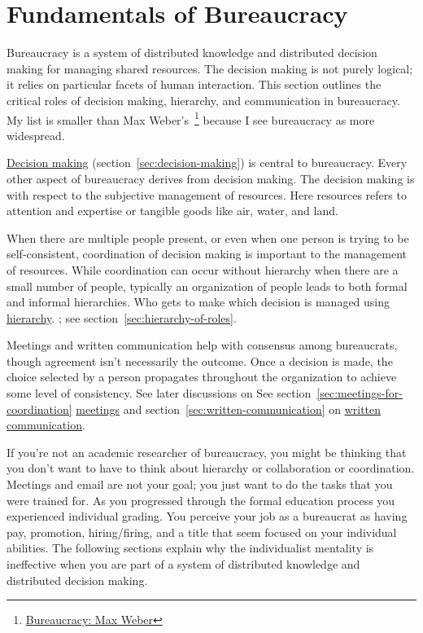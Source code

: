 \section{Fundamentals of Bureaucracy\label{sec:fundamentals-of-b}}
  
Bureaucracy is a system of distributed knowledge and distributed decision making for managing shared resources. The decision making is not purely logical; it relies on particular facets of human interaction. This section outlines the critical roles of decision making, hierarchy, and communication in bureaucracy. 
My list is smaller than Max Weber's~\cite{2015_Weber}\footnote{\href{https://en.wikipedia.org/wiki/Bureaucracy\#Max_Weber}{Bureaucracy: Max Weber}} because I see bureaucracy as more widespread.

\hyperref[sec:decision-making]{Decision making}
\ifsectionref
(section~\ref{sec:decision-making}) 
\fi
is central to bureaucracy. Every other aspect of bureaucracy derives from decision making. The decision making is with respect to the subjective management of resources. Here resources refers to attention and expertise or tangible goods like air, water, and land. 

When there are multiple people present, or even when one person is trying to be self-consistent, coordination of decision making is important to the management of resources. While coordination can occur without hierarchy when there are a small number of people, typically an organization of people leads to both formal and informal hierarchies. Who gets to make which decision is managed using
\hyperref[sec:hierarchy-of-roles]{hierarchy}.
\ifsectionref
; see section~\ref{sec:hierarchy-of-roles}.
\fi

Meetings and written communication help with consensus among bureaucrats, though agreement isn't necessarily the outcome.
Once a decision is made, the choice selected by a person propagates throughout the organization to achieve some level of consistency. 
See later discussions on
\ifsectionref
See section~\ref{sec:meetings-for-coordination}
\fi
\hyperref[sec:meetings-for-coordination]{meetings} and 
\ifsectionref
section~\ref{sec:written-communication} on
\fi
\hyperref[sec:written-communication]{written communication}.

If you're not an academic researcher of bureaucracy, you might be thinking that you don't want to have to think about hierarchy or collaboration or coordination. Meetings and email are not your goal; you just want to do the tasks that you were trained for. As you progressed through the formal education process you experienced individual grading. You perceive your job as a bureaucrat as having pay, promotion, hiring/firing, and a title that  seem focused on your individual abilities. The following sections explain why the individualist mentality is ineffective when you are part of a system of distributed knowledge and distributed decision making. 


